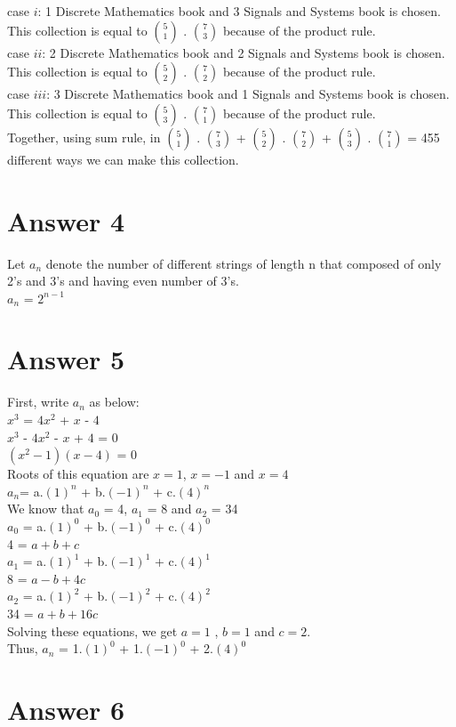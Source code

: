 ﻿\documentclass[12pt]{article}
\begin{document}
case $i$: 1 Discrete Mathematics book and 3 Signals and Systems book is chosen. This collection is equal to $\binom{5}{1}$ . $\binom{7}{3}$ because of the product rule.\\

case $ii$: 2 Discrete Mathematics book and 2 Signals and Systems book is chosen. This collection is equal to $\binom{5}{2}$ . $\binom{7}{2}$ because of the product rule.\\

case $iii$: 3 Discrete Mathematics book and 1 Signals and Systems book is chosen. This collection is equal to $\binom{5}{3}$ . $\binom{7}{1}$ because of the product rule.\\

Together, using sum rule, in $\binom{5}{1}$ . $\binom{7}{3}$ + $\binom{5}{2}$ . $\binom{7}{2}$ + $\binom{5}{3}$ . $\binom{7}{1}$ = 455 different ways we can make this collection.


\section*{Answer 4}

Let $a_n$ denote the number of different strings of length n that composed of only 2's and 3's and having even number of 3's.\\

$a_n$ = $2^{n-1}$\\

\section*{Answer 5}
First, write $a_n$ as below:\\

$x^3$ = $4x^2$ + $x$ - $4$\\

$x^3$ - $4x^2$ - $x$ + $4$ = 0\\

$(x^2-1)$$(x-4)$ = 0\\

Roots of this equation are $x = 1$, $x = -1$ and $x = 4$\\

$a_n$= a.$(1)^n$ + b.$(-1)^n$ + c.$(4)^n$\\

We know that $a_0$ = 4, $a_1$ = 8 and $a_2$ = 34\\

$a_0$ = a.$(1)^0$ + b.$(-1)^0$ + c.$(4)^0$\\

4 = $a + b + c$\\

$a_1$ = a.$(1)^1$ + b.$(-1)^1$ + c.$(4)^1$\\

8 = $a - b + 4c$\\

$a_2$ = a.$(1)^2$ + b.$(-1)^2$ + c.$(4)^2$\\

34 = $a + b + 16c$\\

Solving these equations, we get $a = 1$ , $b = 1$ and $c = 2$.\\

Thus, $a_n$ = 1.$(1)^0$ + 1.$(-1)^0$ + 2.$(4)^0$\\


\section*{Answer 6}
\end{document}
